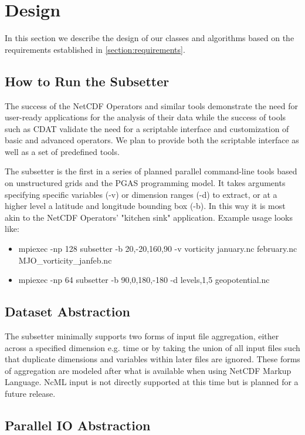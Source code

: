 \section{Design}
\label{section:design}

In this section we describe the design of our classes and algorithms based on
the requirements established in \ref{section:requirements}.

\subsection{How to Run the Subsetter}

The success of the NetCDF Operators and similar tools demonstrate the need for
user-ready applications for the analysis of their data while the success of
tools such as CDAT validate the need for a scriptable interface and customization of
basic and advanced operators.  We plan to provide both the scriptable
interface as well as a set of predefined tools.

The subsetter is the first in a series of planned parallel command-line tools
based on unstructured grids and the PGAS programming model.  It takes
arguments specifying specific variables (-v) or dimension ranges (-d) to
extract, or at a higher level a latitude and longitude bounding box (-b).  In
this way it is most akin to the NetCDF Operators' "kitchen sink" application.
Example usage looks like: \begin{itemize} \item mpiexec -np 128 subsetter -b
20,-20,160,90 -v vorticity january.nc february.nc MJO\_vorticity\_janfeb.nc
\item mpiexec -np 64 subsetter -b 90,0,180,-180 -d levels,1,5 geopotential.nc
\end{itemize}

\subsection{Dataset Abstraction}

The subsetter minimally supports two forms of input file aggregation, either
across a specified dimension e.g. time or by taking the union of all input
files such that duplicate dimensions and variables within later files are
ignored.  These forms of aggregation are modeled after what is available when
using NetCDF Markup Language.\cite{NcML} NcML input is not directly supported
at this time but is planned for a future release. 

\subsection{Parallel IO Abstraction}

